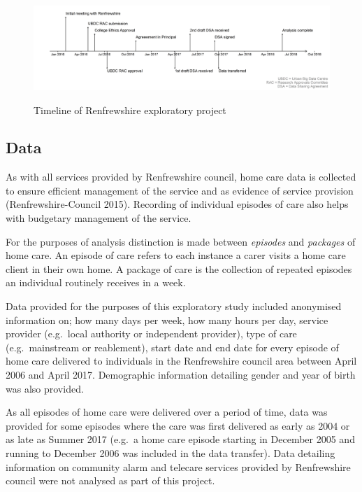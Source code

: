 \documentclass[]{article}
\begin{document}
\begin{figure}[h]
  \centering
    \caption{Timeline of Renfrewshire exploratory project}
    \includegraphics{figures/chapter-renf/renf-timeline.png}
    \label{fig:ren-timeline}
\end{figure}

\subsection{Data}\label{subsec:renf-methods-data}

As with all services provided by Renfrewshire council, home care data is
collected to ensure efficient management of the service and as evidence
of service provision (Renfrewshire-Council 2015). Recording of
individual episodes of care also helps with budgetary management of the
service.

For the purposes of analysis distinction is made between \emph{episodes}
and \emph{packages} of home care. An episode of care refers to each
instance a carer visits a home care client in their own home. A package
of care is the collection of repeated episodes an individual routinely
receives in a week.

Data provided for the purposes of this exploratory study included
anonymised information on; how many days per week, how many hours per
day, service provider (e.g.~local authority or independent provider),
type of care (e.g.~mainstream or reablement), start date and end date
for every episode of home care delivered to individuals in the
Renfrewshire council area between April 2006 and April 2017. Demographic
information detailing gender and year of birth was also provided.

As all episodes of home care were delivered over a period of time, data
was provided for some episodes where the care was first delivered as
early as 2004 or as late as Summer 2017 (e.g.~a home care episode
starting in December 2005 and running to December 2006 was included in
the data transfer). Data detailing information on community alarm and
telecare services provided by Renfrewshire council were not analysed as
part of this project.
\end{document}
